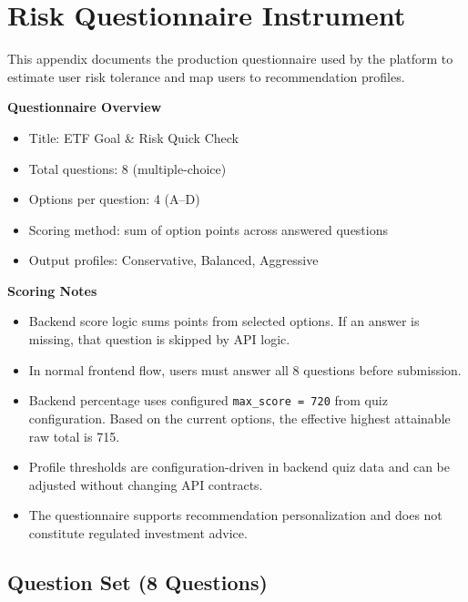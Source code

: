 \chapter{Risk Questionnaire Instrument}
\label{appendix:risk-questionnaire}

This appendix documents the production questionnaire used by the platform to estimate user risk tolerance and map users to recommendation profiles.

\textbf{Questionnaire Overview}

\begin{itemize}[leftmargin=*]
	\item Title: ETF Goal \& Risk Quick Check
	\item Total questions: 8 (multiple-choice)
	\item Options per question: 4 (A--D)
	\item Scoring method: sum of option points across answered questions
	\item Output profiles: Conservative, Balanced, Aggressive
\end{itemize}

\textbf{Scoring Notes}

\begin{itemize}[leftmargin=*]
	\item Backend score logic sums points from selected options. If an answer is missing, that question is skipped by API logic.
	\item In normal frontend flow, users must answer all 8 questions before submission.
	\item Backend percentage uses configured \texttt{max\_score = 720} from quiz configuration. Based on the current options, the effective highest attainable raw total is 715.
	\item Profile thresholds are configuration-driven in backend quiz data and can be adjusted without changing API contracts.
	\item The questionnaire supports recommendation personalization and does not constitute regulated investment advice.
\end{itemize}

\section{Question Set (8 Questions)}

